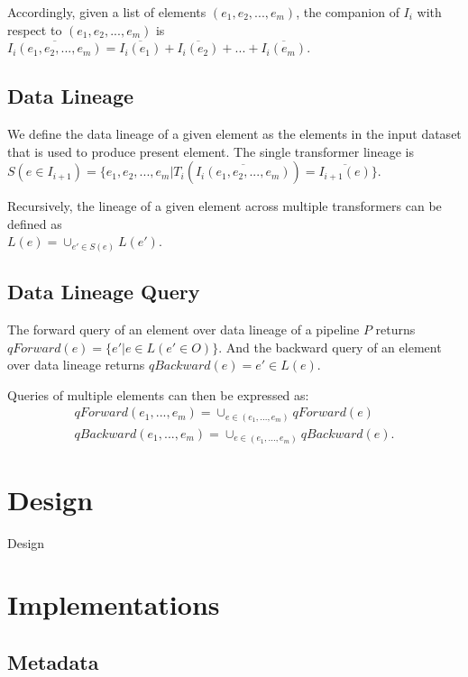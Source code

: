 \documentclass{sig-alternate}
\begin{document}
Accordingly, given a list of elements $(e_1, e_2, ..., e_m)$, the companion of $I_i$ with respect to $(e_1, e_2, ..., e_m)$ is
$\overline{I_i(e_1, e_2, ..., e_m)} = \overline{I_i(e_1)} + \overline{I_i(e_2)} + ... +\overline{I_i(e_m)} $.

\subsection{Data Lineage}
We define the data lineage of a given element as the elements in the input dataset that is used to produce present element.
The single transformer lineage is
$S(e \in I_{i+1}) = \{e_1, e_2, ..., e_m | T_i(\overline{I_i(e_1, e_2, ..., e_m)}) = \overline{I_{i+1}(e)}\}$.

Recursively, the lineage of a given element across multiple transformers can be defined as \\
$L(e) = \cup_{e' \in S(e)} L(e')$.

\subsection{Data Lineage Query}
The forward query of an element over data lineage of a pipeline $P$ returns $qForward(e) = \{e' | e \in L(e' \in O)\}$. 
And the backward query of an element over data lineage returns $qBackward(e) = e' \in L(e)$.

Queries of multiple elements can then be expressed as: 
\begin{equation}
\begin{split}
qForward(e_1, ..., e_m) = \cup_{e \in (e_1, ..., e_m)} qForward(e) \\
qBackward(e_1, ..., e_m) = \cup_{e \in (e_1, ..., e_m)} qBackward(e).
\end{split}
\end{equation}

\section{Design}
\label{sec:Design}
Design

\section{Implementations}
\label{sec:Impl}

\subsection{Metadata}
\end{document}
